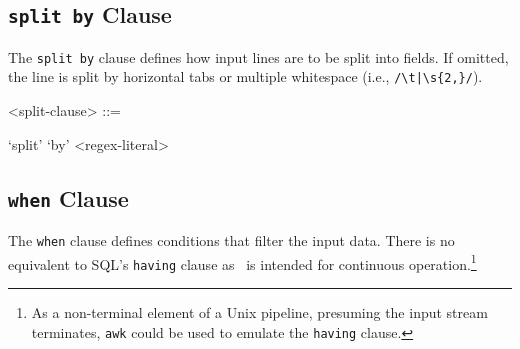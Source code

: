 \subsection{\texttt{split by} Clause}

The \texttt{split by} clause defines how input lines are to be split
into fields. If omitted, the line is split by horizontal tabs or
multiple whitespace (i.e.,
\texttt{/\textbackslash{}t|\textbackslash{}s\{2,\}/}).

\begin{grammar}
  <split-clause> ::= \begin{syntdiag}
    `split' `by' <regex-literal>
  \end{syntdiag}
\end{grammar}

\subsection{\texttt{when} Clause}

The \texttt{when} clause defines conditions that filter the input data.
There is no equivalent to SQL's \texttt{having} clause as \stag\ is
intended for continuous operation.\footnote{As a non-terminal element of
a Unix pipeline, presuming the input stream terminates, \texttt{awk}
could be used to emulate the \texttt{having} clause.}

